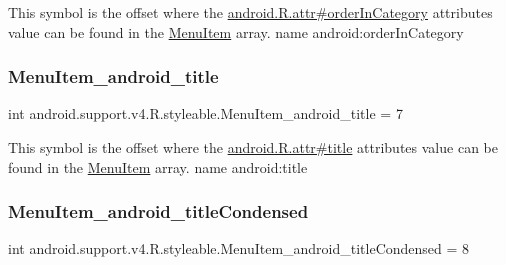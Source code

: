 This symbol is the offset where the \hyperlink{}{android.\+R.\+attr\#order\+In\+Category} attribute\textquotesingle{}s value can be found in the \hyperlink{classandroid_1_1support_1_1v4_1_1R_1_1styleable_a4234e016636b99c0c3d9cfc512903697}{Menu\+Item} array.  name android\+:order\+In\+Category \mbox{\label{classandroid_1_1support_1_1v4_1_1R_1_1styleable_a42591e9c083d69eb5cea71e1accd2d2b}} 
\subsubsection{\texorpdfstring{Menu\+Item\+\_\+android\+\_\+title}{MenuItem\_android\_title}}
{\footnotesize\ttfamily int android.\+support.\+v4.\+R.\+styleable.\+Menu\+Item\+\_\+android\+\_\+title = 7\hspace{0.3cm}{\ttfamily [static]}}

This symbol is the offset where the \hyperlink{}{android.\+R.\+attr\#title} attribute\textquotesingle{}s value can be found in the \hyperlink{classandroid_1_1support_1_1v4_1_1R_1_1styleable_a4234e016636b99c0c3d9cfc512903697}{Menu\+Item} array.  name android\+:title \mbox{\label{classandroid_1_1support_1_1v4_1_1R_1_1styleable_a45ff077834fcd2795e645a9cb5facc6c}} 
\subsubsection{\texorpdfstring{Menu\+Item\+\_\+android\+\_\+title\+Condensed}{MenuItem\_android\_titleCondensed}}
{\footnotesize\ttfamily int android.\+support.\+v4.\+R.\+styleable.\+Menu\+Item\+\_\+android\+\_\+title\+Condensed = 8\hspace{0.3cm}{\ttfamily [static]}}

